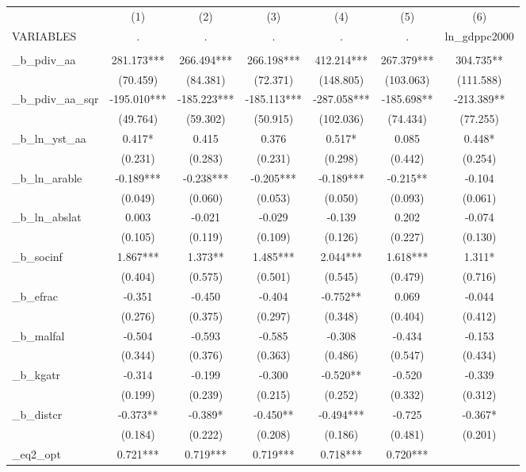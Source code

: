 \documentclass[]{article}
\begin{document}
\begin{tabular}{lcccccc} \hline
 & (1) & (2) & (3) & (4) & (5) & (6) \\
VARIABLES & . & . & . & . & . & ln\_gdppc2000 \\ \hline
 &  &  &  &  &  &  \\
\_b\_pdiv\_aa & 281.173*** & 266.494*** & 266.198*** & 412.214*** & 267.379*** & 304.735** \\
 & (70.459) & (84.381) & (72.371) & (148.805) & (103.063) & (111.588) \\
\_b\_pdiv\_aa\_sqr & -195.010*** & -185.223*** & -185.113*** & -287.058*** & -185.698** & -213.389** \\
 & (49.764) & (59.302) & (50.915) & (102.036) & (74.434) & (77.255) \\
\_b\_ln\_yst\_aa & 0.417* & 0.415 & 0.376 & 0.517* & 0.085 & 0.448* \\
 & (0.231) & (0.283) & (0.231) & (0.298) & (0.442) & (0.254) \\
\_b\_ln\_arable & -0.189*** & -0.238*** & -0.205*** & -0.189*** & -0.215** & -0.104 \\
 & (0.049) & (0.060) & (0.053) & (0.050) & (0.093) & (0.061) \\
\_b\_ln\_abslat & 0.003 & -0.021 & -0.029 & -0.139 & 0.202 & -0.074 \\
 & (0.105) & (0.119) & (0.109) & (0.126) & (0.227) & (0.130) \\
\_b\_socinf & 1.867*** & 1.373** & 1.485*** & 2.044*** & 1.618*** & 1.311* \\
 & (0.404) & (0.575) & (0.501) & (0.545) & (0.479) & (0.716) \\
\_b\_efrac & -0.351 & -0.450 & -0.404 & -0.752** & 0.069 & -0.044 \\
 & (0.276) & (0.375) & (0.297) & (0.348) & (0.404) & (0.412) \\
\_b\_malfal & -0.504 & -0.593 & -0.585 & -0.308 & -0.434 & -0.153 \\
 & (0.344) & (0.376) & (0.363) & (0.486) & (0.547) & (0.434) \\
\_b\_kgatr & -0.314 & -0.199 & -0.300 & -0.520** & -0.520 & -0.339 \\
 & (0.199) & (0.239) & (0.215) & (0.252) & (0.332) & (0.312) \\
\_b\_distcr & -0.373** & -0.389* & -0.450** & -0.494*** & -0.725 & -0.367* \\
 & (0.184) & (0.222) & (0.208) & (0.186) & (0.481) & (0.201) \\
\_eq2\_opt & 0.721*** & 0.719*** & 0.719*** & 0.718*** & 0.720*** &  \\

\end{tabular}
\end{document}
